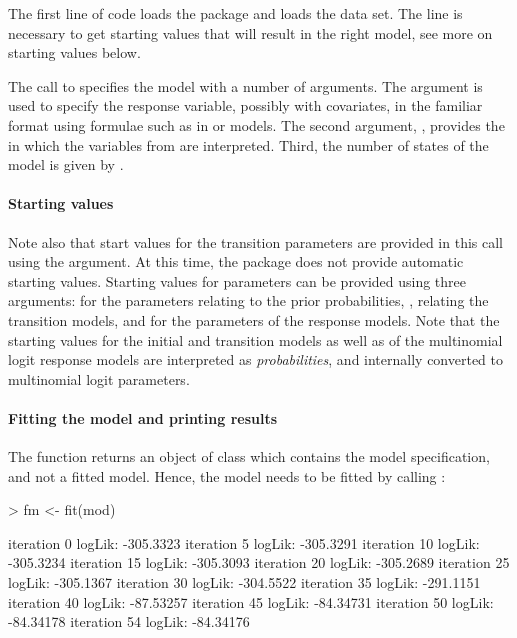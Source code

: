 \documentclass[article]{jss}
\begin{document}
The first line of code loads the  package and 
 loads the  data set. The line
 is necessary to get starting values that will 
result in the right model, see more on starting values below. 

The call to  specifies the model with a number of
arguments.  The  argument is used to specify the
response variable, possibly with covariates, in the familiar format
using formulae such as in  or  models.  The second
argument, , provides the  in which
the variables from  are interpreted.  Third, the number
of states of the model is given by . 


\paragraph{Starting values} Note also that start values for the
transition parameters are provided in this call using the
 argument.  At this time, the package does not provide
automatic starting values.  Starting values for parameters can be
provided using three arguments:  for the parameters
relating to the prior probabilities, , relating the
transition models, and  for the parameters of the
response models.  Note that the starting values for the initial and
transition models as well as of the multinomial logit response models
are interpreted as {\em probabilities}, and internally converted to
multinomial logit parameters.


\paragraph{Fitting the model and printing results} The 
function returns an object of class  which contains the
model specification, and not a fitted model.  Hence, the model needs
to be fitted by calling :
\begin{Schunk}
\begin{Sinput}
> fm <- fit(mod)
\end{Sinput}
\begin{Soutput}
iteration 0 logLik: -305.3323 
iteration 5 logLik: -305.3291 
iteration 10 logLik: -305.3234 
iteration 15 logLik: -305.3093 
iteration 20 logLik: -305.2689 
iteration 25 logLik: -305.1367 
iteration 30 logLik: -304.5522 
iteration 35 logLik: -291.1151 
iteration 40 logLik: -87.53257 
iteration 45 logLik: -84.34731 
iteration 50 logLik: -84.34178 
iteration 54 logLik: -84.34176 
\end{Soutput}
\end{Schunk}
\end{document}
